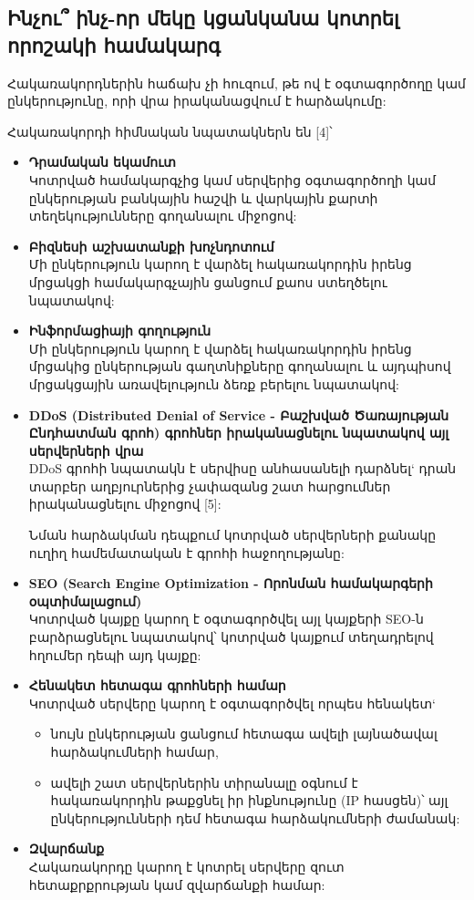 \documentclass[a4paper,12pt]{article}
\begin{document}
\begin{sloppypar}
\subsection{Ինչու՞ ինչ-որ մեկը կցանկանա կոտրել որոշակի համակարգ}


Հակառակորդներին հաճախ չի հուզում, թե ով է օգտագործողը կամ ընկերությունը,
որի վրա իրականացվում է հարձակումը:

Հակառակորդի հիմնական նպատակներն են [4]՝

\begin{itemize}
\item \textbf{Դրամական եկամուտ} \\
	Կոտրված համակարգչից կամ սերվերից օգտագործողի
    կամ ընկերության բանկային հաշվի և վարկային քարտի տեղեկությունները
    գողանալու միջոցով:
\item \textbf{Բիզնեսի աշխատանքի խոչնդոտում} \\
	Մի ընկերություն կարող է վարձել
    հակառակորդին իրենց մրցակցի համակարգչային ցանցում քաոս ստեղծելու
    նպատակով:
\item \textbf{Ինֆորմացիայի գողություն} \\
	Մի ընկերություն կարող է վարձել
    հակառակորդին իրենց մրցակից ընկերության գաղտնիքները գողանալու և
    այդպիսով մրցակցային առավելություն ձեռք բերելու նպատակով:
\item \textbf{DDoS (Distributed Denial of Service - Բաշխված Ծառայության Ընդհատման գրոհ) գրոհներ
    իրականացնելու նպատակով այլ սերվերների վրա} \\
	DDoS գրոհի նպատակն է սերվիսը անհասանելի դարձնել`
	դրան տարբեր աղբյուրներից չափազանց շատ հարցումներ
	իրականացնելու միջոցով [5]:
	
    Նման հարձակման դեպքում կոտրված սերվերների քանակը
	ուղիղ համեմատական է գրոհի հաջողությանը:
\item \textbf{SEO (Search Engine Optimization - Որոնման համակարգերի օպտիմալացում)} \\
	Կոտրված կայքը կարող է
    օգտագործվել այլ կայքերի SEO-ն բարձրացնելու նպատակով՝ կոտրված կայքում
    տեղադրելով հղումեր դեպի այդ կայքը:
\item \textbf{Հենակետ հետագա գրոհների համար} \\
	Կոտրված սերվերը կարող է օգտագործվել
	որպես հենակետ`
	\begin{itemize}
	\item նույն ընկերության ցանցում հետագա ավելի լայնածավալ հարձակումների
		համար,
	\item ավելի շատ սերվերներին տիրանալը օգնում է հակառակորդին թաքցնել
		իր ինքնությունը (IP հասցեն)՝ այլ ընկերությունների դեմ հետագա
		հարձակումների ժամանակ:
	\end{itemize}
\item \textbf{Զվարճանք} \\
	Հակառակորդը կարող է կոտրել սերվերը զուտ հետաքրքրության կամ
    զվարճանքի համար:
\end{itemize}



\end{sloppypar}
\end{document}
